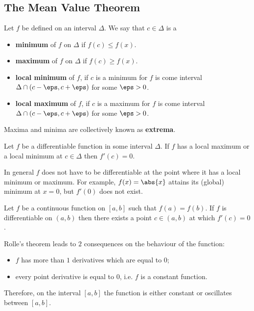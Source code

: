 \documentclass[12pt, a4paper]{article}
\begin{document}
\subsection{The Mean Value Theorem}

\begin{definition}
    Let \(f\) be defined on an interval \(\Delta\). We say that \(c \in \Delta\) is a
    \begin{itemize}
        \item \textbf{minimum} of \(f\) on \(\Delta\) if \(f(c) \leq f(x)\).
        \item \textbf{maximum} of \(f\) on \(\Delta\) if \(f(c) \geq f(x)\).
        \item \textbf{local minimum} of \(f\), if \(c\) is a minimum for \(f\) is come interval \(\Delta \cap (c-\eps,c+\eps)\) for some \(\eps>0\).
        \item \textbf{local maximum} of \(f\), if \(c\) is a maximum for \(f\) is come interval \(\Delta \cap (c-\eps,c+\eps)\) for some \(\eps>0\).
    \end{itemize}
\end{definition}

\begin{mdremark}
    Maxima and minima are collectively known as \textbf{extrema}.
\end{mdremark}

\begin{theorem}
    Let \(f\) be a differentiable function in some interval \(\Delta\). If \(f\) has a local maximum or a local minimum at \(c \in \Delta\) then \(f'(c)=0\).
\end{theorem}

\begin{mdremark}
    In general \(f\) does not have to be differentiable at the point where it has a local minimum or maximum. For example, \(f(x)=\abs{x}\) attains its (global) minimum at \(x=0\), but \(f'(0)\) does not exist.
\end{mdremark}

\begin{theorem}
    Let \(f\) be a continuous function on \([a,b]\) such that \(f(a)=f(b)\). If \(f\) is differentiable on \((a,b)\) then there exists a point \(c \in (a,b)\) at which \(f'(c)=0\).
\end{theorem}

\begin{mdnote}
    Rolle's theorem leads to \(2\) consequences on the behaviour of the function:
    \begin{itemize}
        \item \(f\) has more than \(1\) derivatives which are equal to \(0\);
        \item every point derivative is equal to \(0\), i.e. \(f\) is a constant function.
    \end{itemize}
    Therefore, on the interval \([a,b]\) the function is either constant or oscillates between \([a,b]\).
\end{mdnote}
\end{document}
